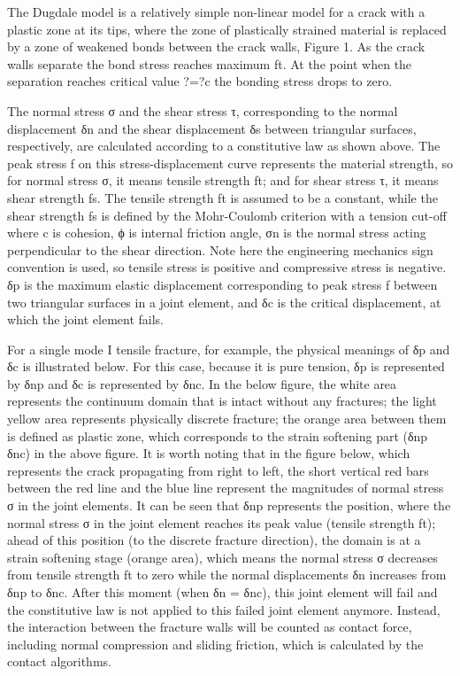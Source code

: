 \documentclass[format=acmtog, 12pt, screen=true, review=false]{acmart}
\begin{document}
The Dugdale model is a relatively simple non-linear model for a crack with a plastic zone at its tips, where the zone of plastically strained material is replaced by a zone of weakened bonds between the crack walls, Figure 1. As the crack walls separate the bond stress reaches maximum ft. At the point when the separation reaches critical value ?=?c the bonding stress drops to zero.


\bigbreak
The normal stress σ and the shear stress τ, corresponding to the normal displacement δn and the shear displacement δs between triangular surfaces, respectively, are calculated according to a constitutive law as shown above. The peak stress f on this stress-displacement curve represents the material strength, so for normal stress σ, it means tensile strength ft; and for shear stress τ, it means shear strength fs. The tensile strength ft is assumed to be a constant, while the shear strength fs is defined by the Mohr-Coulomb criterion with a tension cut-off where c is cohesion,  ϕ is internal friction angle, σn is the normal stress acting perpendicular to the shear direction. Note here the engineering mechanics sign convention is used, so tensile stress is positive and compressive stress is negative. δp is the maximum elastic displacement corresponding to peak stress f between two triangular surfaces in a joint element, and δc is the critical displacement, at which the joint element fails.

For a single mode I tensile fracture, for example, the physical meanings of δp and δc is illustrated below. For this case, because it is pure tension, δp is represented by δnp and δc is represented by δnc. In the below figure, the white area represents the continuum domain that is intact without any fractures; the light yellow area represents physically discrete fracture; the orange area between them is defined as plastic zone, which corresponds to the strain softening part (δnp ~ δnc) in the above figure. It is worth noting that in the figure below, which represents the crack propagating from right to left, the short vertical red bars between the red line and the blue line represent the magnitudes of normal stress σ in the joint elements. It can be seen that δnp represents the position, where the normal stress σ in the joint element reaches its peak value (tensile strength ft); ahead of this position (to the discrete fracture direction), the domain is at a strain softening stage (orange area), which means the normal stress σ decreases from tensile strength ft to zero while the normal displacements δn increases from δnp to δnc. After this moment (when δn = δnc), this joint element will fail and the constitutive law is not applied to this failed joint element anymore. Instead, the interaction between the fracture walls will be counted as contact force, including normal compression and sliding friction, which is calculated by the contact algorithms. 
\end{document}
